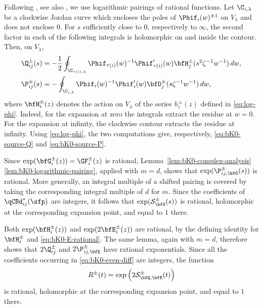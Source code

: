 \documentclass[reqno]{amsart}
\numberwithin{equation}{section}
\begin{document}
\subsubsection{}\label{sss:pf-mero-2}
Following \cite[Sec.~8.6]{gautam-toledano-17}, see also
\cite{appel-gautam-wendlandt-26,appel-gautam-26}, we use logarithmic
pairings of rational functions. Let $\C_{i,\lambda}$ be a clockwise
Jordan curve which encloses the poles of
$\Phif_i(w)^{\pm1}$ on $V_\lambda$ and does not enclose $0$.
For $s$ sufficiently close to $0$, respectively to $\infty$, the
second factor in each of the following integrals is holomorphic on and
inside the contour. Then,
on $V_\lambda$,
\begin{align}
\Q_{ij}^\pm(s)
&=
-\frac12\oint_{\C_{\tau(i),\lambda}}
\Phif_{\tau(i)}(w)^{-1}\Phif_{\tau(i)}'(w)
\bfH_j^\pm(s^2\zeta^{-1}w^{-1})\,dw,
\label{eq:bK0-contour-Q}\\
\P_{ij}^\pm(s)
&=
-\oint_{\C_{i,\lambda}}
\Phif_i(w)^{-1}\Phif_i'(w)
\bfD_j^\pm(s\zeta^{-1}w^{-1})\,dw,
\label{eq:bK0-contour-P}
\end{align}
where $\bfH^\pm_i(z)$ denotes the action on $V_\lambda$ of the series $h^\pm_i(z)$ defined in \eqref{eq:log-phi}.
Indeed, for the expansion at zero the integrals extract the residue at
$w=0$. For the expansion at infinity, the clockwise contour extracts
the residue at infinity. Using \eqref{eq:log-phi}, the two computations
give, respectively, \eqref{eq:bK0-source-Q} and
\eqref{eq:bK0-source-P}.

Since $\exp(\bfG_i^\pm(z))=\GF_i^\pm(z)$ is rational,
Lemma~\ref{lem:bK0-complex-analysis}\eqref{lem:bK0-logarithmic-pairing},
applied with $m=d$, shows that
$\exp(\P_{ij,\bfG}^\pm(s))$ is rational. More generally, an integral
multiple of a shifted pairing is covered by taking the corresponding
integral multiple of $d$ for $m$. Since the coefficients of
$\qCBd^*_{ij}(\sfp)$ are integers, it follows that
$\exp(\mathcal S_{\bfG}^\pm(s))$ is rational, holomorphic at the
corresponding expansion point, and equal to $1$ there.

Both $\exp(\bfH_i^\pm(z))$ and
$\exp(2\bfE_i^\pm(z))$ are rational, by the defining identity for
$\bfH_i^\pm$ and \eqref{eq:bK0-E-rational}. The same lemma, again with
$m=d$, therefore shows that $2\Q_{ij}^\pm$ and
$2\P_{ij,\bfE}^\pm$ have rational exponentials. Since all the
coefficients occurring in \eqref{eq:bK0-even-diff} are integers, the
function
\begin{equation}\label{eq:bK0-doubled-source}
R^\pm(t)=\exp\left(2\mathcal S_{\bfQ,\bfE}^\pm(t)\right)
\end{equation}
is rational, holomorphic at the corresponding expansion point, and
equal to $1$ there.\\
\end{document}
